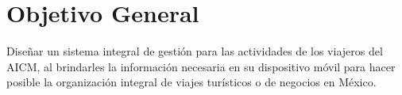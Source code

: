 \section{Objetivo General}

Diseñar un sistema integral de gestión para las actividades de los viajeros del AICM, al brindarles la información necesaria en su dispositivo móvil para hacer posible la organización integral de viajes turísticos o de negocios en México.